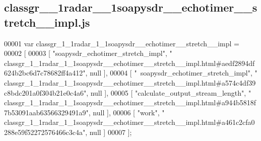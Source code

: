 \subsection{classgr\+\_\+\_\+1radar\+\_\+\_\+1soapysdr\+\_\+\+\_\+echotimer\+\_\+\+\_\+stretch\+\_\+\+\_\+impl.\+js}
\label{classgr__1__1radar__1__1soapysdr____echotimer____stretch____impl_8js_source}

\begin{DoxyCode}
00001 var classgr_1_1radar_1_1soapysdr__echotimer__stretch__impl =
00002 [
00003     [ \textcolor{stringliteral}{"soapysdr\_echotimer\_stretch\_impl"}, \textcolor{stringliteral}{"
      classgr\_1\_1radar\_1\_1soapysdr\_\_echotimer\_\_stretch\_\_impl.html#aedf2894df624b2bc6d7c78682ff4a412"}, null ],
00004     [ \textcolor{stringliteral}{"~soapysdr\_echotimer\_stretch\_impl"}, \textcolor{stringliteral}{"
      classgr\_1\_1radar\_1\_1soapysdr\_\_echotimer\_\_stretch\_\_impl.html#a574c4df39c8bdc201a0f304b21e0c4a6"}, null ],
00005     [ \textcolor{stringliteral}{"calculate\_output\_stream\_length"}, \textcolor{stringliteral}{"
      classgr\_1\_1radar\_1\_1soapysdr\_\_echotimer\_\_stretch\_\_impl.html#a944b5818f7b53091aab63566329491a9"}, null ],
00006     [ \textcolor{stringliteral}{"work"}, \textcolor{stringliteral}{"
      classgr\_1\_1radar\_1\_1soapysdr\_\_echotimer\_\_stretch\_\_impl.html#a461c2cfa0288e59f52272576466c3c4a"}, null ]
00007 ];
\end{DoxyCode}
